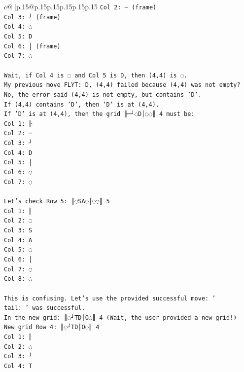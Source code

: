 \documentclass{article}
\begin{document}
{\begin{supertabular}{c@{$\;$}|p{.15\linewidth}@{}p{.15\linewidth}p{.15\linewidth}p{.15\linewidth}p{.15\linewidth}p{.15\linewidth}}
{{{\texttt{Col 2: ─ (frame)} \\
\texttt{Col 3: ┘ (frame)} \\
\texttt{Col 4: ◌} \\
\texttt{Col 5: D} \\
\texttt{Col 6: │ (frame)} \\
\texttt{Col 7: ◌} \\
\\ 
\texttt{Wait, if Col 4 is ◌ and Col 5 is D, then (4,4) is ◌.} \\
\texttt{My previous move FLYT: D, (4,4) failed because (4,4) was not empty? No, the error said (4,4) is not empty, but contains 'D'.} \\
\texttt{If (4,4) contains 'D', then 'D' is at (4,4).} \\
\texttt{If 'D' is at (4,4), then the grid ╟─┘◌D│◌◌║ 4 must be:} \\
\texttt{Col 1: ╟} \\
\texttt{Col 2: ─} \\
\texttt{Col 3: ┘} \\
\texttt{Col 4: D} \\
\texttt{Col 5: │} \\
\texttt{Col 6: ◌} \\
\texttt{Col 7: ◌} \\
\\ 
\texttt{Let's check Row 5: ║◌SA◌│◌◌║ 5} \\
\texttt{Col 1: ║} \\
\texttt{Col 2: ◌} \\
\texttt{Col 3: S} \\
\texttt{Col 4: A} \\
\texttt{Col 5: ◌} \\
\texttt{Col 6: │} \\
\texttt{Col 7: ◌} \\
\texttt{Col 8: ◌} \\
\\ 
\texttt{This is confusing. Let's use the provided successful move: '} \\
\texttt{tail: ' was successful.} \\
\texttt{In the new grid: ║◌┘TD│O◌║ 4 (Wait, the user provided a new grid!)} \\
\texttt{New grid Row 4: ║◌┘TD│O◌║ 4} \\
\texttt{Col 1: ║} \\
\texttt{Col 2: ◌} \\
\texttt{Col 3: ┘} \\
\texttt{Col 4: T} \\
}}}
\end{supertabular}}
\end{document}
